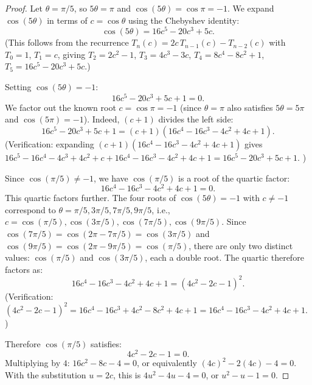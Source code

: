 \documentclass[11pt,a4paper]{article}
\theoremstyle{plain}
\theoremstyle{definition}
\begin{document}
\begin{proof}
Let $\theta = \pi/5$, so $5\theta = \pi$ and $\cos(5\theta) = \cos\pi = -1$.
We expand $\cos(5\theta)$ in terms of $c = \cos\theta$ using the
Chebyshev identity:
\begin{equation}\label{eq:cos5}
  \cos(5\theta) = 16c^5 - 20c^3 + 5c.
\end{equation}
(This follows from the recurrence $T_n(c) = 2c\,T_{n-1}(c) - T_{n-2}(c)$
with $T_0 = 1$, $T_1 = c$, giving $T_2 = 2c^2 - 1$,
$T_3 = 4c^3 - 3c$, $T_4 = 8c^4 - 8c^2 + 1$,
$T_5 = 16c^5 - 20c^3 + 5c$.)

Setting $\cos(5\theta) = -1$:
\begin{equation}\label{eq:cos5-eq}
  16c^5 - 20c^3 + 5c + 1 = 0.
\end{equation}
We factor out the known root $c = \cos\pi = -1$ (since $\theta = \pi$
also satisfies $5\theta = 5\pi$ and $\cos(5\pi) = -1$). Indeed,
$(c + 1)$ divides the left side:
\[
  16c^5 - 20c^3 + 5c + 1 = (c + 1)(16c^4 - 16c^3 - 4c^2 + 4c + 1).
\]
(Verification: expanding $(c+1)(16c^4 - 16c^3 - 4c^2 + 4c + 1)$
gives $16c^5 - 16c^4 - 4c^3 + 4c^2 + c + 16c^4 - 16c^3 - 4c^2 + 4c + 1
= 16c^5 - 20c^3 + 5c + 1$. \checkmark)

Since $\cos(\pi/5) \neq -1$, we have $\cos(\pi/5)$ is a root of the
quartic factor:
\begin{equation}\label{eq:quartic}
  16c^4 - 16c^3 - 4c^2 + 4c + 1 = 0.
\end{equation}
This quartic factors further. The four roots of $\cos(5\theta) = -1$ with
$c \neq -1$ correspond to $\theta = \pi/5, 3\pi/5, 7\pi/5, 9\pi/5$,
i.e., $c = \cos(\pi/5), \cos(3\pi/5), \cos(7\pi/5), \cos(9\pi/5)$.
Since $\cos(7\pi/5) = \cos(2\pi - 7\pi/5) = \cos(3\pi/5)$ and
$\cos(9\pi/5) = \cos(2\pi - 9\pi/5) = \cos(\pi/5)$, there are only
two distinct values: $\cos(\pi/5)$ and $\cos(3\pi/5)$, each a double root.
The quartic therefore factors as:
\begin{equation}\label{eq:quartic-factor}
  16c^4 - 16c^3 - 4c^2 + 4c + 1
  = (4c^2 - 2c - 1)^2.
\end{equation}
(Verification: $(4c^2 - 2c - 1)^2 = 16c^4 - 16c^3 + 4c^2 - 8c^2 + 4c + 1
= 16c^4 - 16c^3 - 4c^2 + 4c + 1$. \checkmark)

Therefore $\cos(\pi/5)$ satisfies:
\begin{equation}\label{eq:quadratic-cos}
  4c^2 - 2c - 1 = 0.
\end{equation}
Multiplying by $4$: $16c^2 - 8c - 4 = 0$, or equivalently
$(4c)^2 - 2(4c) - 4 = 0$. With the substitution $u = 2c$, this is
$4u^2 - 4u - 4 = 0$, or $u^2 - u - 1 = 0$.


\end{proof}
\end{document}
